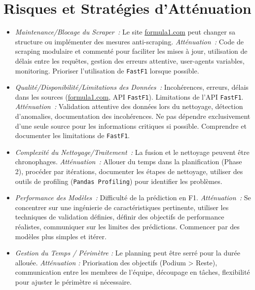 \documentclass[11pt, a4paper]{article}
\newcommand{\lib}[1]{\texttt{#1}}
\begin{document}
\section{Risques et Stratégies d'Atténuation}
\begin{description}[style=standard, itemsep=0.5em, leftmargin=1.5em]
    \item[Risques Identifiés et Stratégies~:]
    \begin{itemize}[label=\textbullet, itemsep=0.2em, leftmargin=*]
        \item \textit{Maintenance/Blocage du Scraper~:} Le site \url{formula1.com} peut changer sa structure ou implémenter des mesures anti-scraping.
            \subitem \textit{Atténuation~:} Code de scraping modulaire et commenté pour faciliter les mises à jour, utilisation de délais entre les requêtes, gestion des erreurs attentive, user-agents variables, monitoring. Prioriser l'utilisation de \lib{FastF1} lorsque possible. %
        \item \textit{Qualité/Disponibilité/Limitations des Données~:} Incohérences, erreurs, délais dans les sources (\url{formula1.com}, API \lib{FastF1}). Limitations de l'API \lib{FastF1}.
            \subitem \textit{Atténuation~:} Validation attentive des données lors du nettoyage, détection d'anomalies, documentation des incohérences. Ne pas dépendre exclusivement d'une seule source pour les informations critiques si possible. Comprendre et documenter les limitations de \lib{FastF1}. %
        \item \textit{Complexité du Nettoyage/Traitement~:} La fusion et le nettoyage peuvent être chronophages. %
            \subitem \textit{Atténuation~:} Allouer du temps dans la planification (Phase 2), procéder par itérations, documenter les étapes de nettoyage, utiliser des outils de profiling (\lib{Pandas Profiling}) pour identifier les problèmes. %
        \item \textit{Performance des Modèles~:} Difficulté de la prédiction en F1. %
            \subitem \textit{Atténuation~:} Se concentrer sur une ingénierie de caractéristiques pertinente, utiliser les techniques de validation définies, définir des objectifs de performance réalistes, communiquer sur les limites des prédictions. Commencer par des modèles plus simples et itérer. %
        \item \textit{Gestion du Temps / Périmètre :} Le planning peut être serré pour la durée allouée. 
             \subitem \textit{Atténuation :} Priorisation des objectifs (Podium > Reste), communication entre les membres de l'équipe, découpage en tâches, flexibilité pour ajuster le périmètre si nécessaire.
    \end{itemize}
\end{description}
\end{document}
